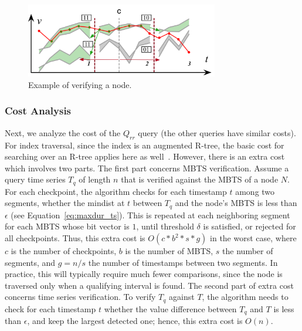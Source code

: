 \begin{figure}[!tb]
    \centering
    \includegraphics[width=0.75\textwidth]{Figures/partition_checkpoint_check.png}
    \caption{Example of verifying a \sbtsr node.}
    \label{fig:part_checkpnt}
\end{figure}

\subsubsection{Cost Analysis}
\label{subsubsec:cost}
Next, we analyze the cost of the $Q_{rr}$ query (the other queries have similar costs). For index traversal, since the index is an augmented R-tree, the basic cost for searching over an R-tree applies here as well~\cite{Guttman1984}. However, there is an extra cost which involves two parts. The first part concerns MBTS verification. Assume a query time series $T_q$ of length $n$ that is verified against the MBTS of a node $N$. For each checkpoint, the algorithm checks for each timestamp $t$ among two segments, whether the mindist at $t$ between $T_q$ and the node’s MBTS is less than $\epsilon$ (see Equation~\ref{eq:maxdur_ts}). This is repeated at each neighboring segment for each MBTS whose bit vector is $1$, until threshold $\delta$ is satisfied, or rejected for all checkpoints. Thus, this extra cost is $O(c*b^2*s*g)$ in the worst case, where $c$ is the number of checkpoints, $b$ is the number of MBTS, $s$ the number of segments, and $g=n/s$ the number of timestamps between two segments. In practice, this will typically require much fewer comparisons, since the node is traversed only when a qualifying interval is found. The second part of extra cost concerns time series verification. To verify $T_q$ against $T$, the algorithm needs to check for each timestamp $t$ whether the value difference between $T_q$ and $T$ is less than $\epsilon$, and keep the largest detected one; hence, this extra cost is $O(n)$.